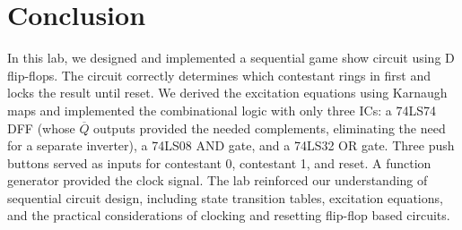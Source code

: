 \documentclass[12pt, letterpaper]{article}
\begin{document}
\section{Conclusion}

In this lab, we designed and implemented a sequential game show circuit using D flip-flops. The circuit correctly determines which contestant rings in first and locks the result until reset. We derived the excitation equations using Karnaugh maps and implemented the combinational logic with only three ICs: a 74LS74 DFF (whose $\overline{Q}$ outputs provided the needed complements, eliminating the need for a separate inverter), a 74LS08 AND gate, and a 74LS32 OR gate. Three push buttons served as inputs for contestant 0, contestant 1, and reset. A function generator provided the clock signal. The lab reinforced our understanding of sequential circuit design, including state transition tables, excitation equations, and the practical considerations of clocking and resetting flip-flop based circuits.
\end{document}
